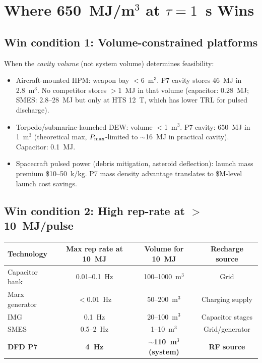 \documentclass[11pt]{article}
\newcommand{\Pmax}{P_{\rm max}}
\begin{document}
\section{Where 650~MJ/m$^3$ at $\tau = 1$~s Wins}

\subsection{Win condition 1: Volume-constrained platforms}

When the \emph{cavity volume} (not system volume) determines feasibility:
\begin{itemize}[nosep]
  \item Aircraft-mounted HPM: weapon bay $<$6~m$^3$.
    P7 cavity stores 46~MJ in 2.8~m$^3$. No competitor stores $>$1~MJ
    in that volume (capacitor: 0.28~MJ; SMES: 2.8--28~MJ but only at
    HTS 12~T, which has lower TRL for pulsed discharge).
  \item Torpedo/submarine-launched DEW: volume $<$1~m$^3$.
    P7 cavity: 650~MJ in 1~m$^3$ (theoretical max, $\Pmax$-limited to
    $\sim$16~MJ in practical cavity). Capacitor: 0.1~MJ.
  \item Spacecraft pulsed power (debris mitigation, asteroid deflection):
    launch mass premium \$10--50~k/kg. P7 mass density advantage translates
    to \$M-level launch cost savings.
\end{itemize}

\subsection{Win condition 2: High rep-rate at $>$10~MJ/pulse}

\begin{center}
\begin{tabular}{lccc}
\toprule
Technology & Max rep rate at 10~MJ & Volume for 10~MJ & Recharge source \\
\midrule
Capacitor bank & 0.01--0.1~Hz & 100--1000~m$^3$ & Grid \\
Marx generator & $<$0.01~Hz & 50--200~m$^3$ & Charging supply \\
IMG & 0.1~Hz & 20--100~m$^3$ & Capacitor stages \\
SMES & 0.5--2~Hz & 1--10~m$^3$ & Grid/generator \\
\textbf{DFD P7} & \textbf{4~Hz} & \textbf{$\sim$110~m$^3$ (system)} & \textbf{RF source} \\
\bottomrule
\end{tabular}
\end{center}
\end{document}
